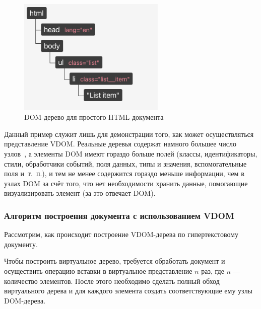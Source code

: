 \begin{figure}[h]
	\centering
	\includegraphics[width=70mm]{img/dom-to-vdom-dom.png}
	\caption{DOM-дерево для простого HTML документа}
	\label{fig:dom-to-vdom-dom}
\end{figure}


Данный пример служит лишь для демонстрации того, как может осуществляться представление VDOM.
Реальные деревья содержат намного большее число узлов~\cite{dom-element}, а элементы DOM имеют гораздо больше полей (классы, идентификаторы, стили, обработчики событий, поля данных, типы и значения, вспомогательные поля и~т.~п.), и тем не менее содержится гораздо меньше информации, чем в узлах DOM за счёт того, что нет необходимости хранить данные, помогающие визуализировать элемент (за это отвечает DOM).

\subsubsection{Алгоритм построения документа с использованием VDOM}

Рассмотрим, как происходит построение VDOM-дерева по гипертекстовому документу.

Чтобы построить виртуальное дерево, требуется обработать документ и осуществить операцию вставки в виртуальное представление $n$ раз, где $n$ --- количество элементов.
После этого необходимо сделать полный обход виртуального дерева и для каждого элемента создать соответствующие ему узлы DOM-дерева.

